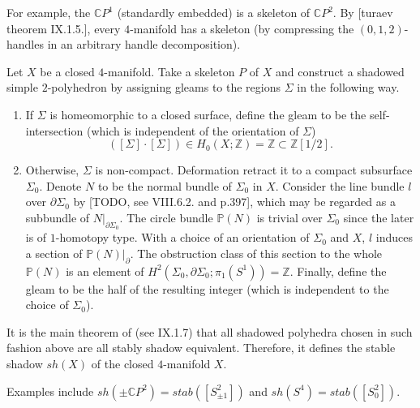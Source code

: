 \noindent For example, the $\mathbb{C}P^{1}$ (standardly
embedded) is a skeleton of $\mathbb{C}P^{2}$. By [turaev theorem
IX.1.5.], every $4$-manifold has a skeleton (by compressing the
$(0,1,2)$-handles in an arbitrary handle decomposition).

\begin{definition}\label{def/stable-shadow-of-a-4-manifold}
  Let $X$ be a closed $4$-manifold. Take a skeleton $P$ of $X$
  and construct a shadowed simple $2$-polyhedron by assigning
  gleams to the regions $\Sigma$ in the following way.
  \begin{enumerate}
    \item If $\Sigma$ is homeomorphic to a closed surface, define
          the gleam to be the self-intersection (which is
          independent of the orientation of $\Sigma$)
          $$([\Sigma] \cdot [\Sigma]) \in H_{0}(X;\mathbb{Z}) = \mathbb{Z} \subset \mathbb{Z}\left[1/2\right].$$
    \item Otherwise, $\Sigma$ is non-compact. Deformation retract
          it to a compact subsurface $\Sigma_{0}$. Denote $N$ to
          be the normal bundle of $\Sigma_{0}$ in $X$. Consider
          the line bundle $l$ over $\partial \Sigma_{0}$ by
          [TODO, see VIII.6.2. and p.397], which may be regarded
          as a subbundle of $N|_{\partial \Sigma_{0}}$. The
          circle bundle $\mathbb{P}(N)$ is trivial over
          $\Sigma_{0}$ since the later is of $1$-homotopy type.
          With a choice of an orientation of $\Sigma_{0}$ and
          $X$, $l$ induces a section of
          $\mathbb{P}(N)|_{\partial}$. The obstruction class of
          this section to the whole $\mathbb{P}(N)$ is an element
          of
          $H^{2}(\Sigma_{0}, \partial \Sigma_{0}; \pi_{1}(S^{1})) = \mathbb{Z}$.
          Finally, define the gleam to be the half of the
          resulting integer (which is independent to the choice
          of $\Sigma_{0}$).
  \end{enumerate}
  It is the main theorem of \cite[chapter IX]{turaev} (see
  IX.1.7) that all shadowed polyhedra chosen in such fashion
  above are all stably shadow equivalent. Therefore, it defines
  the stable shadow $sh(X)$ of the closed $4$-manifold $X$.
\end{definition}

\noindent Examples include
$sh(\pm\mathbb{C}P^{2}) = stab([S^{2}_{\pm 1}])$ and
$sh(S^{4}) = stab([S^{2}_{0}])$.

